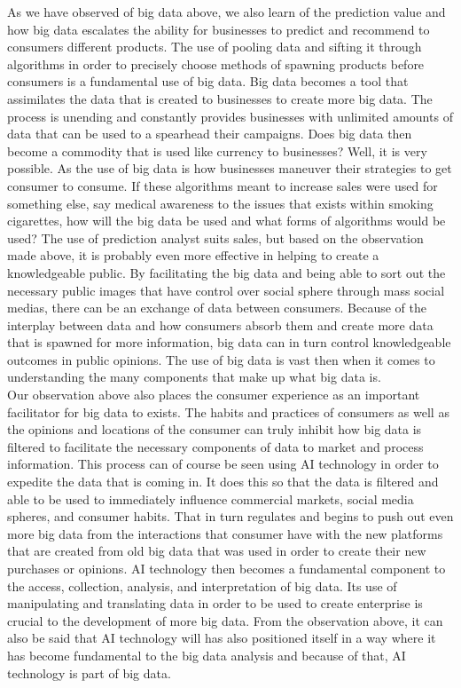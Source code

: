 \documentclass[sigconf]{acmart}
\begin{document}
As we have observed of big data above, we also learn of the prediction value and how big data escalates the ability for businesses to predict and recommend to consumers different products. The use of pooling data and sifting it through algorithms in order to precisely choose methods of spawning products before consumers is a fundamental use of big data. Big data becomes a tool that assimilates the data that is created to businesses to create more big data. The process is unending and constantly provides businesses with unlimited amounts of data that can be used to a spearhead their campaigns. Does big data then become a commodity that is used like currency to businesses? Well, it is very possible. As the use of big data is how businesses maneuver their strategies to get consumer to consume. If these algorithms meant to increase sales were used for something else, say medical awareness to the issues that exists within smoking cigarettes, how will the big data be used and what forms of algorithms would be used? The use of prediction analyst suits sales, but based on the observation made above, it is probably even more effective in helping to create a knowledgeable public. By facilitating the big data and being able to sort out the necessary public images that have control over social sphere through mass social medias, there can be an exchange of data between consumers. Because of the interplay between data and how consumers absorb them and create more data that is spawned for more information, big data can in turn control knowledgeable outcomes in public opinions. The use of big data is vast then when it comes to understanding the many components that make up what big data is.\\ 

Our observation above also places the consumer experience as an important facilitator for big data to exists. The habits and practices of consumers as well as the opinions and locations of the consumer can truly inhibit how big data is filtered to facilitate the necessary components of data to market and process information. This process can of course be seen using AI technology in order to expedite the data that is coming in. It does this so that the data is filtered and able to be used to immediately influence commercial markets, social media spheres, and consumer habits. That in turn regulates and begins to push out even more big data from the interactions that consumer have with the new platforms that are created from old big data that was used in order to create their new purchases or opinions. AI technology then becomes a fundamental component to the access, collection, analysis, and interpretation of big data. Its use of manipulating and translating data in order to be used to create enterprise is crucial to the development of more big data. From the observation above, it can also be said that AI technology will has also positioned itself in a way where it has become fundamental to the big data analysis and because of that, AI technology is part of big data.\\ 
\end{document}
